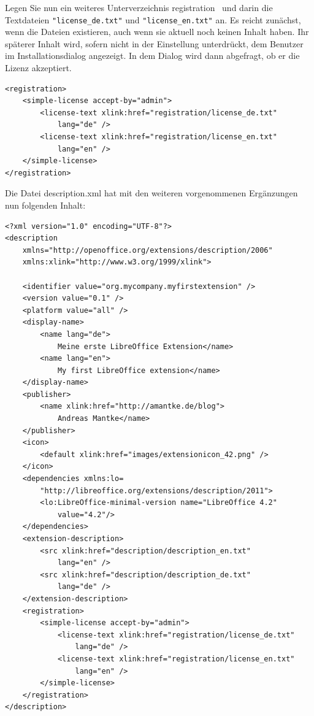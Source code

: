 \documentclass[a4paper,10pt,pagesize,titlepage]{scrbook}
\begin{document}
\bigskip
\bigskip
Legen Sie nun ein weiteres Unterverzeichnis \glqq registration\grqq~ und darin die Textdateien \verb|"license_de.txt"| und \verb|"license_en.txt"| an. Es reicht zunächst, wenn die Dateien existieren, auch wenn sie aktuell noch keinen Inhalt haben. Ihr späterer Inhalt wird, sofern nicht in der Einstellung unterdrückt, dem Benutzer im Installationsdialog angezeigt. In dem Dialog wird dann abgefragt, ob er die Lizenz akzeptiert.

\begin{lstlisting}
<registration>
    <simple-license accept-by="admin">
        <license-text xlink:href="registration/license_de.txt" 
            lang="de" />
        <license-text xlink:href="registration/license_en.txt" 
            lang="en" />
    </simple-license>
</registration>
\end{lstlisting}

Die Datei description.xml hat mit den weiteren vorgenommenen Ergänzungen nun folgenden Inhalt:

\begin{lstlisting}
<?xml version="1.0" encoding="UTF-8"?>
<description
    xmlns="http://openoffice.org/extensions/description/2006"
    xmlns:xlink="http://www.w3.org/1999/xlink">

    <identifier value="org.mycompany.myfirstextension" />
    <version value="0.1" />
    <platform value="all" />
    <display-name>
        <name lang="de">
            Meine erste LibreOffice Extension</name>
        <name lang="en">
            My first LibreOffice extension</name>
    </display-name>
    <publisher>
        <name xlink:href="http://amantke.de/blog">
            Andreas Mantke</name>
    </publisher>
    <icon>
        <default xlink:href="images/extensionicon_42.png" />
    </icon>
    <dependencies xmlns:lo=
        "http://libreoffice.org/extensions/description/2011">
        <lo:LibreOffice-minimal-version name="LibreOffice 4.2" 
            value="4.2"/>
    </dependencies>
    <extension-description>
        <src xlink:href="description/description_en.txt" 
            lang="en" />
        <src xlink:href="description/description_de.txt" 
            lang="de" />
    </extension-description>
    <registration>
        <simple-license accept-by="admin">
            <license-text xlink:href="registration/license_de.txt" 
                lang="de" />
            <license-text xlink:href="registration/license_en.txt" 
                lang="en" />
        </simple-license>
    </registration>
</description>

\end{lstlisting}
\end{document}
